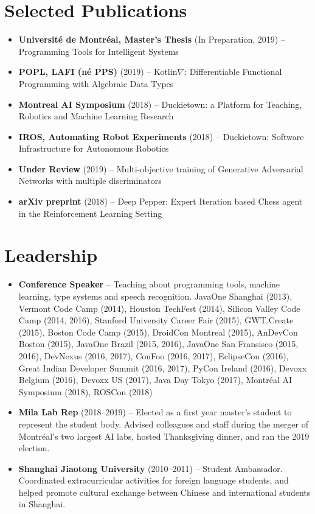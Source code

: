 \documentclass[letterpaper,11pt]{article}
\newcommand{\resumeItem}[2]{
\item\small{
\textbf{#1}{ #2 \vspace{-2pt}}
}
}
\newcommand{\resumeSubItem}[2]{\resumeItem{#1}{#2}\vspace{-4pt}}
\newcommand{\resumeSubHeadingListStart}{\begin{itemize}[leftmargin=*]}
\newcommand{\resumeSubHeadingListEnd}{\end{itemize}}
\begin{document}
\begin{justify}
\section{Selected Publications}
\resumeSubHeadingListStart
\resumeSubItem{Universit\'e de Montr\'eal, Master's Thesis} {(In Preparation, 2019) -- Programming Tools for Intelligent Systems}
\resumeSubItem{POPL, LAFI (n\'e PPS)} {(2019) -- Kotlin$\nabla$: Differentiable Functional Programming with Algebraic Data Types}
\resumeSubItem{Montreal AI Symposium} {(2018) -- Duckietown: a Platform for Teaching, Robotics and Machine Learning Research}
\resumeSubItem{IROS, Automating Robot Experiments} {(2018) -- Duckietown: Software Infrastructure for Autonomous Robotics}
\resumeSubItem{Under Review} {(2019) -- Multi-objective training of Generative Adversarial Networks with multiple discriminators}
\resumeSubItem{arXiv preprint} {(2018) -- Deep Pepper: Expert Iteration based Chess agent in the Reinforcement Learning Setting}
\resumeSubHeadingListEnd

\section{Leadership}
\resumeSubHeadingListStart
\resumeSubItem{Conference Speaker} {-- Teaching about programming tools, machine learning, type systems and speech recognition. JavaOne Shanghai (2013), Vermont Code Camp (2014), Houston TechFest (2014), Silicon Valley Code Camp (2014, 2016), Stanford University Career Fair (2015), GWT.Create (2015), Boston Code Camp (2015), DroidCon Montreal (2015), AnDevCon Boston (2015), JavaOne Brazil (2015, 2016), JavaOne San Fransisco (2015, 2016), DevNexus (2016, 2017), ConFoo (2016, 2017), EclipseCon (2016), Great Indian Developer Summit (2016, 2017), PyCon Ireland (2016), Devoxx Belgium (2016), Devoxx US (2017), Java Day Tokyo (2017), Montr\'eal AI Symposium (2018), ROSCon (2018)}
\resumeSubItem{Mila Lab Rep} {(2018--2019) -- Elected as a first year master's student to represent the student body. Advised colleagues and staff during the merger of Montr\'eal's two largest AI labs, hosted Thanksgiving dinner, and ran the 2019 election.}
\resumeSubItem{Shanghai Jiaotong University} {(2010--2011) -- Student Ambassador. Coordinated extracurricular activities for foreign language students, and helped promote cultural exchange between Chinese and international students in Shanghai.}
\resumeSubHeadingListEnd


\end{justify}
\end{document}
